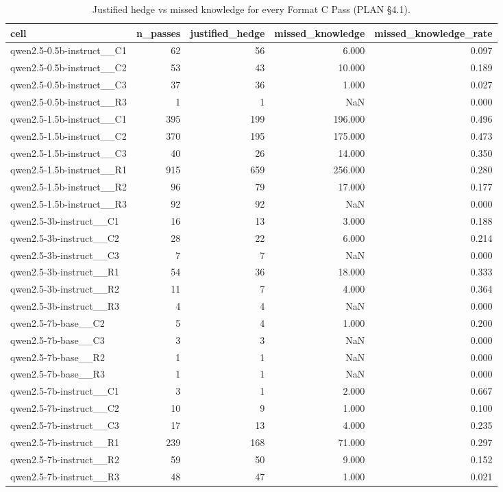 \begin{table}
\caption{Justified hedge vs missed knowledge for every Format C Pass (PLAN §4.1).}
\label{tab:t11_abstention_split}
\begin{tabular}{lrrrr}
\toprule
cell & n\_passes & justified\_hedge & missed\_knowledge & missed\_knowledge\_rate \\
\midrule
qwen2.5-0.5b-instruct\_\_C1 & 62 & 56 & 6.000 & 0.097 \\
qwen2.5-0.5b-instruct\_\_C2 & 53 & 43 & 10.000 & 0.189 \\
qwen2.5-0.5b-instruct\_\_C3 & 37 & 36 & 1.000 & 0.027 \\
qwen2.5-0.5b-instruct\_\_R3 & 1 & 1 & NaN & 0.000 \\
qwen2.5-1.5b-instruct\_\_C1 & 395 & 199 & 196.000 & 0.496 \\
qwen2.5-1.5b-instruct\_\_C2 & 370 & 195 & 175.000 & 0.473 \\
qwen2.5-1.5b-instruct\_\_C3 & 40 & 26 & 14.000 & 0.350 \\
qwen2.5-1.5b-instruct\_\_R1 & 915 & 659 & 256.000 & 0.280 \\
qwen2.5-1.5b-instruct\_\_R2 & 96 & 79 & 17.000 & 0.177 \\
qwen2.5-1.5b-instruct\_\_R3 & 92 & 92 & NaN & 0.000 \\
qwen2.5-3b-instruct\_\_C1 & 16 & 13 & 3.000 & 0.188 \\
qwen2.5-3b-instruct\_\_C2 & 28 & 22 & 6.000 & 0.214 \\
qwen2.5-3b-instruct\_\_C3 & 7 & 7 & NaN & 0.000 \\
qwen2.5-3b-instruct\_\_R1 & 54 & 36 & 18.000 & 0.333 \\
qwen2.5-3b-instruct\_\_R2 & 11 & 7 & 4.000 & 0.364 \\
qwen2.5-3b-instruct\_\_R3 & 4 & 4 & NaN & 0.000 \\
qwen2.5-7b-base\_\_C2 & 5 & 4 & 1.000 & 0.200 \\
qwen2.5-7b-base\_\_C3 & 3 & 3 & NaN & 0.000 \\
qwen2.5-7b-base\_\_R2 & 1 & 1 & NaN & 0.000 \\
qwen2.5-7b-base\_\_R3 & 1 & 1 & NaN & 0.000 \\
qwen2.5-7b-instruct\_\_C1 & 3 & 1 & 2.000 & 0.667 \\
qwen2.5-7b-instruct\_\_C2 & 10 & 9 & 1.000 & 0.100 \\
qwen2.5-7b-instruct\_\_C3 & 17 & 13 & 4.000 & 0.235 \\
qwen2.5-7b-instruct\_\_R1 & 239 & 168 & 71.000 & 0.297 \\
qwen2.5-7b-instruct\_\_R2 & 59 & 50 & 9.000 & 0.152 \\
qwen2.5-7b-instruct\_\_R3 & 48 & 47 & 1.000 & 0.021 \\
\bottomrule
\end{tabular}
\end{table}
